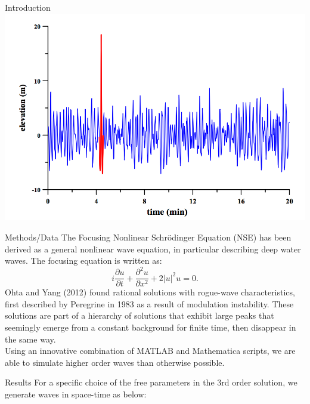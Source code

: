 \documentclass[final]{beamer}
\begin{document}
\begin{frame}{}
\begin{columns}[t]
\begin{column}{.35\linewidth}
\begin{block}{Introduction}
	\centering
\includegraphics[width=600px]{draupner_wave.png}
	\end{block}
	\hspace{0.25cm}
	\begin{block}{Methods/Data}
The Focusing Nonlinear Schr\"{o}dinger Equation (NSE) has been derived as a general nonlinear wave equation, in particular describing deep water waves. The focusing equation is written as: \[ i\frac{\partial u}{\partial t} + \frac{\partial ^2 u}{\partial x^2} + 2 |u| ^2 u = 0 .\] Ohta and Yang (2012) found rational solutions with rogue-wave characteristics, first described by Peregrine in 1983 as a result of modulation instability. These solutions are part of a hierarchy of solutions that exhibit large peaks that seemingly emerge from a constant background for finite time, then disappear in the same way.\\
\vspace{5mm}
Using an innovative combination of MATLAB and Mathematica scripts, we are able to simulate higher order waves than otherwise possible.
	\end{block}
	\hspace{0.25cm}
  	\begin{block}{Results}
For a specific choice of the free parameters in the 3rd order solution, we generate waves in space-time as below:


\end{block}
\end{column}
\end{columns}
\end{frame}
\end{document}
